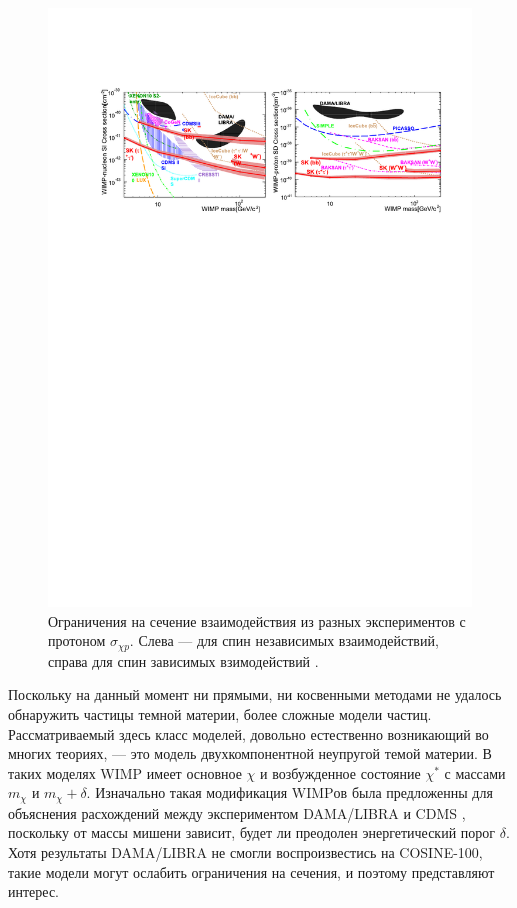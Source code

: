 \begin{figure}[htb]
	\begin{center}
		\includegraphics[scale=0.9]{images/SK_graphs.pdf}
		\caption{Ограничения на сечение взаимодействия из разных экспериментов с протоном $\sigma_{\chi p}$. Слева --- для спин независимых взаимодействий, справа для спин зависимых взимодействий \cite{kamiokandecollaboration2015search}.}
	\end{center}
\end{figure}

Поскольку на данный момент ни прямыми, ни косвенными методами не удалось обнаружить частицы темной материи, более сложные модели частиц. Рассматриваемый здесь класс моделей, довольно естественно возникающий во многих теориях, --- это модель двухкомпонентной неупругой темой материи. В таких моделях WIMP имеет основное $\chi$ и возбужденное состояние $\chi^*$ с массами $m_{\chi}$ и $m_{\chi}+\delta$. Изначально такая модификация WIMPов была предложенны для объяснения расхождений между экспериментом DAMA/LIBRA и CDMS \cite{PhysRevD.64.043502}, поскольку от массы мишени зависит, будет ли преодолен энергетический порог $\delta$. Хотя результаты DAMA/LIBRA не смогли воспроизвестись на COSINE-100, такие модели могут ослабить ограничения на сечения, и поэтому представляют интерес.

